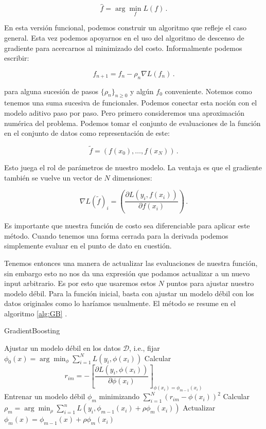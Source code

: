 $$ \hat f = \arg\min_f L(f) \,.$$

En esta versión funcional, podemos construir un algoritmo que refleje el caso general. Esta vez podemos apoyarnos en el uso del algoritmo de descenso de gradiente para acercarnos al minimizado del costo. Informalmente podemos escribir:

$$ f_{n+1} = f_n - \rho_n \nabla L(f_n) \,.$$

para alguna sucesión de pasos $\{\rho_n\}_{n\geq 0}$ y algún $f_0$ conveniente. Notemos como tenemos una suma sucesiva de funcionales. Podemos conectar esta noción con el modelo aditivo paso por paso. Pero primero consideremos una aproximación numérica del problema. Podemos tomar el conjunto de evaluaciones de la función en el conjunto de datos como representación de este:

$$ \tilde f = \left( f(x_0), \dots, f(x_N) \right) \,. $$

Esto juega el rol de parámetros de nuestro modelo. La ventaja es que el gradiente también se vuelve un vector de $N$ dimensiones:

$$ \nabla L(\tilde f)_i = \left( \frac{\partial L(y_i,f(x_i))}{\partial f(x_i)} \right) \,. $$

Es importante que nuestra función de costo sea diferenciable para aplicar este método. Cuando tenemos una forma cerrada para la derivada podemos simplemente evaluar en el punto de dato en cuestión.

Tenemos entonces una manera de actualizar las evaluaciones de nuestra función, sin embargo esto no nos da una expresión que podamos actualizar a un nuevo input arbitrario. Es por esto que usaremos estos $N$ puntos para ajustar nuestro modelo débil. Para la función inicial, basta con ajustar un modelo débil con los datos originales como lo haríamos usualmente. El método se resume en el algoritmo \ref{alg:GB} \cite{pml1Book}.

\begin{algorithm}[H]
\caption{GradientBoosting
\label{alg:GB}}
    \begin{algorithmic}[1]
        \State Ajustar un modelo débil en los datos $\mathcal{D}$, i.e., fijar $\phi_0(x) = \arg\min_\phi \sum^N_{i=1} L(y_i,\phi(x_i))$
            \State Calcular 
            $$ r_{im} = - \left[ \frac{\partial L(y_i, \phi(x_i))}{\partial \phi(x_i)} \right]_{\phi(x_i) = \phi_{m-1}(x_i)} $$
            \State Entrenar un modelo débil $\phi_m$  minimizando $\displaystyle \sum_{i=1}^N(r_{im} - \phi(x_i))^2$
            \State Calcular $\rho_m = \arg\min_\rho \sum^n_{i=1} L(y_i,\phi_{m-1}(x_i) + \rho \phi_m(x_i))$
            \State Actualizar $\phi_m(x) = \phi_{m-1}(x) + \rho \phi_m(x_i) $
        \EndFor
    \EndFunction
    \end{algorithmic}
\end{algorithm}

